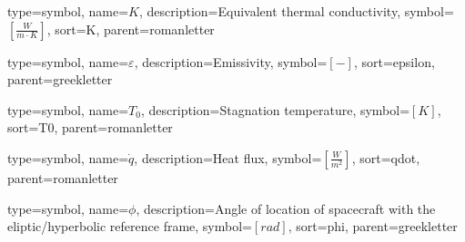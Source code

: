 {
	type=symbol, %
	name={\ensuremath{K}}, %
	description={Equivalent thermal conductivity}, %
	symbol={$\left[\frac{W}{m\cdot K}\right]$}, %
	sort=K, %
	parent=romanletter %
}

{
	type=symbol, %
	name={\ensuremath{\varepsilon}}, %
	description={Emissivity}, %
	symbol={$\left[-\right]$}, %
	sort=epsilon, %
	parent=greekletter %
}

{
	type=symbol, %
	name={\ensuremath{T_0}}, %
	description={Stagnation temperature}, %
	symbol={$\left[K\right]$}, %
	sort=T0, %
	parent=romanletter %
}
	
{
	type=symbol, %
	name={\ensuremath{\dot{q}}}, %
	description={Heat flux}, %
	symbol={$\left[ \frac{W}{m^2} \right]$}, %
	sort=qdot, %
	parent=romanletter %
}

{
type=symbol, %
name={\ensuremath{\phi}}, %
description={Angle of location of spacecraft with the eliptic/hyperbolic reference frame}, %
symbol={$\left[rad\right]$}, %
sort=phi, %
parent=greekletter %
}

